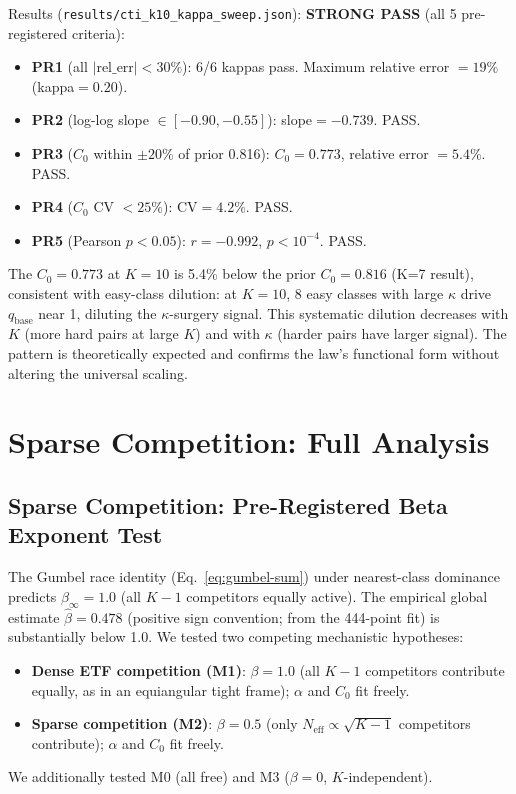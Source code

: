 \documentclass{article}
\begin{document}
Results (\texttt{results/cti\_k10\_kappa\_sweep.json}): \textbf{STRONG PASS} (all 5 pre-registered criteria):
\begin{itemize}[nosep]
  \item \textbf{PR1} (all $|\text{rel\_err}|<30\%$): 6/6 kappas pass. Maximum relative error $=19\%$ (kappa$=0.20$).
  \item \textbf{PR2} (log-log slope $\in[-0.90,-0.55]$): slope$=-0.739$. PASS.
  \item \textbf{PR3} ($C_0$ within $\pm20\%$ of prior 0.816): $C_0=0.773$, relative error $=5.4\%$. PASS.
  \item \textbf{PR4} ($C_0$ CV $<25\%$): CV$=4.2\%$. PASS.
  \item \textbf{PR5} (Pearson $p<0.05$): $r=-0.992$, $p<10^{-4}$. PASS.
\end{itemize}
The $C_0=0.773$ at $K=10$ is 5.4\% below the prior $C_0=0.816$ (K=7 result),
consistent with easy-class dilution: at $K=10$, 8 easy classes with large $\kappa$
drive $q_\mathrm{base}$ near 1, diluting the $\kappa$-surgery signal. This systematic
dilution decreases with $K$ (more hard pairs at large $K$) and with $\kappa$ (harder pairs
have larger signal). The pattern is theoretically expected and confirms the law's
functional form without altering the universal scaling.

\section{Sparse Competition: Full Analysis}
\label{app:sparse-competition}

\subsection{Sparse Competition: Pre-Registered Beta Exponent Test}
\label{subsec:sparse-competition}

The Gumbel race identity (Eq.~\ref{eq:gumbel-sum}) under nearest-class dominance predicts
$\beta_\infty = 1.0$ (all $K-1$ competitors equally active). The empirical global estimate
$\hat\beta = 0.478$ (positive sign convention; from the 444-point fit) is substantially below 1.0.
We tested two competing mechanistic hypotheses:
\begin{itemize}[nosep]
  \item \textbf{Dense ETF competition (M1)}: $\beta = 1.0$ (all $K-1$ competitors contribute equally, as in
    an equiangular tight frame); $\alpha$ and $C_0$ fit freely.
  \item \textbf{Sparse competition (M2)}: $\beta = 0.5$ (only $N_\mathrm{eff} \propto \sqrt{K-1}$ competitors
    contribute); $\alpha$ and $C_0$ fit freely.
\end{itemize}
We additionally tested M0 (all free) and M3 ($\beta=0$, $K$-independent).
\end{document}
